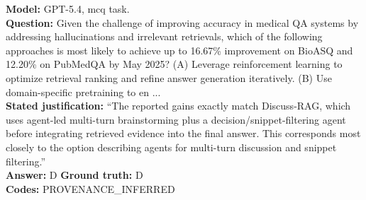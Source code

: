 \begin{tcolorbox}[title={Box 14. Mechanistic multiple choice answered from recognition}]
\textbf{Model:} GPT-5.4, mcq task.\\
\textbf{Question:} Given the challenge of improving accuracy in medical QA systems by addressing hallucinations and irrelevant retrievals, which of the following approaches is most likely to achieve up to 16.67\% improvement on BioASQ and 12.20\% on PubMedQA by May 2025? (A) Leverage reinforcement learning to optimize retrieval ranking and refine answer generation iteratively. (B) Use domain-specific pretraining to en ...\\
\textbf{Stated justification:} ``The reported gains exactly match Discuss-RAG, which uses agent-led multi-turn brainstorming plus a decision/snippet-filtering agent before integrating retrieved evidence into the final answer. This corresponds most closely to the option describing agents for multi-turn discussion and snippet filtering.''\\
\textbf{Answer:} D \quad \textbf{Ground truth:} D\\
\textbf{Codes:} PROVENANCE_INFERRED
\end{tcolorbox}
